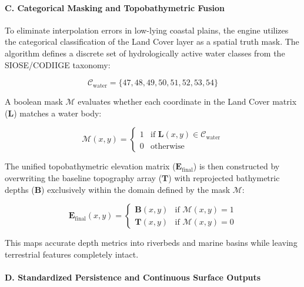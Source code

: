 \paragraph{C. Categorical Masking and Topobathymetric Fusion}

To eliminate interpolation errors in low-lying coastal plains, the engine utilizes the categorical classification of the Land Cover layer as a spatial truth mask. The algorithm defines a discrete set of hydrologically active water classes from the \\ SIOSE/CODIIGE taxonomy:

\begin{equation}
    \mathcal{C}_{\text{water}} = \{47, 48, 49, 50, 51, 52, 53, 54\}
\end{equation}

A boolean mask $\mathcal{M}$ evaluates whether each coordinate in the Land Cover matrix ($\mathbf{L}$) matches a water body:

\begin{equation}
    \mathcal{M}(x,y) = 
    \begin{cases} 
      1 & \text{if } \mathbf{L}(x,y) \in \mathcal{C}_{\text{water}} \\
      0 & \text{otherwise}
    \end{cases}
\end{equation}

The unified topobathymetric elevation matrix ($\mathbf{E}_{\text{final}}$) is then constructed by overwriting the baseline topography array ($\mathbf{T}$) with reprojected bathymetric depths ($\mathbf{B}$) exclusively within the domain defined by the mask $\mathcal{M}$:

\begin{equation}
    \mathbf{E}_{\text{final}}(x,y) = 
    \begin{cases} 
      \mathbf{B}(x,y) & \text{if } \mathcal{M}(x,y) = 1 \\
      \mathbf{T}(x,y) & \text{if } \mathcal{M}(x,y) = 0
    \end{cases}
\end{equation}

This maps accurate depth metrics into riverbeds and marine basins while leaving terrestrial features completely intact.

\paragraph{D. Standardized Persistence and Continuous Surface Outputs}

